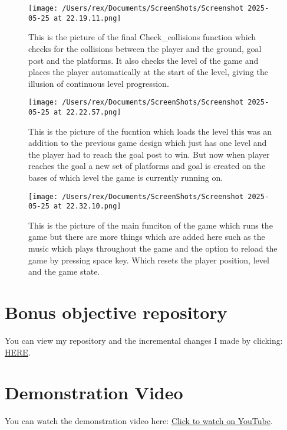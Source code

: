 \documentclass[11pt]{article}
\begin{document}
\begin{figure}[!ht]
    \centering
    \texttt{[image: /Users/rex/Documents/ScreenShots/Screenshot 2025-05-25 at 22.19.11.png]}
    \caption{This is the picture of the final Check\_collisions function which checks for the collisions between the player and the ground, goal post and the platforms. It also checks the level of the game and places the player automatically at the start of the level, giving the illusion of continuous level progression.}
\end{figure}

\begin{figure}[!ht]
    \centering
    \texttt{[image: /Users/rex/Documents/ScreenShots/Screenshot 2025-05-25 at 22.22.57.png]}
    \caption{This is the picture of the fucntion which loads the level this was an addition to the previous game design which just has one level and the player had to reach the goal post to win. But now when player reaches the goal a new set of platforms and goal is created on the bases of which level the game is currently running on.}
\end{figure}

\begin{figure}[!ht]
    \centering
    \texttt{[image: /Users/rex/Documents/ScreenShots/Screenshot 2025-05-25 at 22.32.10.png]}
    \caption{ This is the picture of the main funciton of the game which runs the game but there are more things which are added here such as the music which plays throughout the game and the option to reload the game by pressing space key. Which resets the player position, level and the game state.}
\end{figure}

\clearpage
\section{Bonus objective repository}
You can view my repository and the incremental changes I made by clicking: \href{https://youtu.be/boPe4kzw5Eo}{HERE}.
\section{Demonstration Video}

You can watch the demonstration video here: \href{https://youtu.be/boPe4kzw5Eo}{Click to watch on YouTube}.
\end{document}

